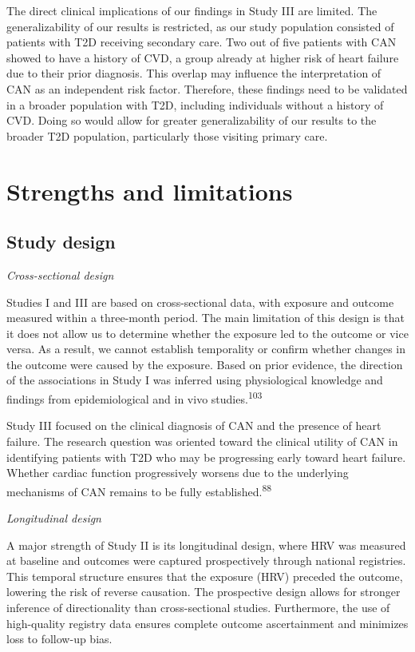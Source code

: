 \documentclass[
  letterpaper,
  headsepline=true,
  open=any]{scrbook}
\begin{document}
The direct clinical implications of our findings in Study III are
limited. The generalizability of our results is restricted, as our study
population consisted of patients with T2D receiving secondary care. Two
out of five patients with CAN showed to have a history of CVD, a group
already at higher risk of heart failure due to their prior diagnosis.
This overlap may influence the interpretation of CAN as an independent
risk factor. Therefore, these findings need to be validated in a broader
population with T2D, including individuals without a history of CVD.
Doing so would allow for greater generalizability of our results to the
broader T2D population, particularly those visiting primary care.

\hypertarget{strengths-and-limitations}{%
\section{Strengths and limitations}\label{strengths-and-limitations}}

\hypertarget{study-design}{%
\subsection{Study design}\label{study-design}}

\emph{Cross-sectional design}

Studies I and III are based on cross-sectional data, with exposure and
outcome measured within a three-month period. The main limitation of
this design is that it does not allow us to determine whether the
exposure led to the outcome or vice versa. As a result, we cannot
establish temporality or confirm whether changes in the outcome were
caused by the exposure. Based on prior evidence, the direction of the
associations in Study I was inferred using physiological knowledge and
findings from epidemiological and in vivo studies.\textsuperscript{103}

Study III focused on the clinical diagnosis of CAN and the presence of
heart failure. The research question was oriented toward the clinical
utility of CAN in identifying patients with T2D who may be progressing
early toward heart failure. Whether cardiac function progressively
worsens due to the underlying mechanisms of CAN remains to be fully
established.\textsuperscript{88}

\emph{Longitudinal design}

A major strength of Study II is its longitudinal design, where HRV was
measured at baseline and outcomes were captured prospectively through
national registries. This temporal structure ensures that the exposure
(HRV) preceded the outcome, lowering the risk of reverse causation. The
prospective design allows for stronger inference of directionality than
cross-sectional studies. Furthermore, the use of high-quality registry
data ensures complete outcome ascertainment and minimizes loss to
follow-up bias.
\end{document}
